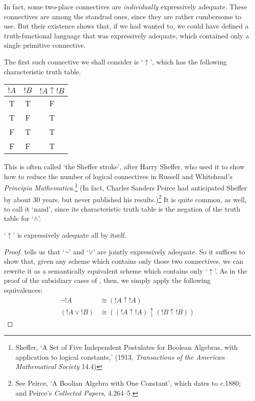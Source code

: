 \documentclass[../../../include/open-logic-section]{subfiles}
\begin{document}
In fact, some two-place connectives are \emph{individually} expressively adequate. These connectives are among the standrad ones, since they are rather cumbersome to use. But their existence shows that, if we had wanted to, we could have defined a truth-functional language that was expressively adequate, which contained only a single primitive connective.

The first such connective we shall consider is `$\uparrow$', which has the following characteristic truth table. 
\begin{center}
\begin{tabular}{c c | c}
${!A}$ & ${!B}$ & ${!A} \mathrel{\uparrow} {!B}$\\
\hline
 T & T & F \\
 T & F & T \\
 F & T & T  \\
 F & F & T
\end{tabular}
\end{center}
 This is often called `the Sheffer stroke', after Harry Sheffer, who used it to show how to reduce the number of logical connectives in Russell and Whitehead's \emph{Principia Mathematica}.\footnote{Sheffer, `A Set of Five Independent Postulates for Boolean Algebras, with application to logical constants,' (1913, \emph{Transactions of the American Mathematical Society} 14.4)} (In fact, Charles Sanders Peirce had anticipated Sheffer by about 30 years, but never published his results.)\footnote{See Peirce, `A Boolian Algebra with One Constant', which dates to c.1880; and Peirce's \emph{Collected Papers}, 4.264--5.} It is quite common, as well, to call it `nand', since its characteristic truth table is the negation of the truth table for `$\land$'.
\begin{prop}`$\uparrow$' is expressively adequate all by itself. 
	\begin{proof}
		 tells us that `$\lnot$' and `$\lor$' are jointly expressively adequate. So it suffices to show that, given any scheme which contains only those two connectives, we can rewrite it as a semantically equivalent scheme which contains only `$\uparrow$'. As in the proof of the subsidiary cases of , then, we simply apply the following equivalences:
		\begin{align*}
			\lnot {!A} &\cong ({!A} \uparrow {!A})\\
			({!A} \lor {!B}) & \cong (({!A} \uparrow {!A}) \uparrow ({!B} \uparrow {!B}))
		\end{align*}
	\end{proof}
\end{prop}\noindent
\end{document}
